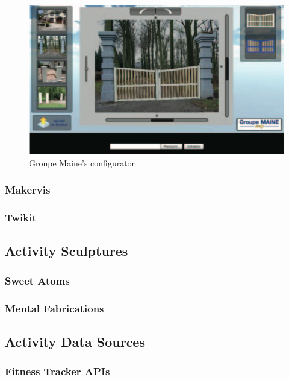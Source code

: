 \documentclass[medieninformatik-arbeit.tex]{subfiles}
\begin{document}
\begin{figure}[hb]
\begin{center}
  \includegraphics[width=.9\linewidth]{RelatedWork/img/gates-config.png}
  \caption{Groupe Maine's configurator\cite{rolland2012commerce} }
\label{fig:gates-config}
\end{center}
\end{figure}

\subsubsection{Makervis}

\subsubsection{Twikit}

\subsection{Activity Sculptures}

\subsubsection{Sweet Atoms}

\subsubsection{Mental Fabrications}

\subsection{Activity Data Sources}

\subsubsection{Fitness Tracker APIs}
\end{document}
